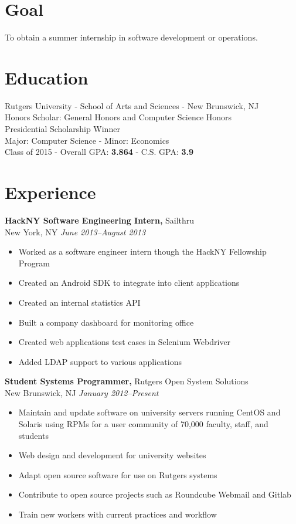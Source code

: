 \documentclass[margin]{res}
\begin{document}
 
\begin{resume} 

\section{Goal}
To obtain a summer internship in software development or operations.
 
\section{Education} 
Rutgers University - School of Arts and Sciences - New Brunswick, NJ\\
Honors Scholar: General Honors and Computer Science Honors\\
Presidential Scholarship Winner\\
Major: Computer Science - Minor: Economics\\
Class of 2015 - Overall GPA: {\bf 3.864} - C.S. GPA: {\bf 3.9}

\section{Experience}

{\bf HackNY Software Engineering Intern,} Sailthru\\
New York, NY \textit{June 2013--August 2013}
\begin{itemize} \itemsep -2pt
    \item Worked as a software engineer intern though the HackNY Fellowship
    Program
    \item Created an Android SDK to integrate into client applications
    \item Created an internal statistics API
    \item Built a company dashboard for monitoring office
    \item Created web applications test cases in Selenium Webdriver
    \item Added LDAP support to various applications
\end{itemize}


{\bf Student Systems Programmer,} Rutgers Open System Solutions\\
New Brunswick, NJ \textit{January 2012--Present}
\begin{itemize} \itemsep -2pt %
	\item Maintain and update software on university servers running CentOS and Solaris using RPMs for a user community of 70,000 faculty, staff, and students
	\item Web design and development for university websites
	\item Adapt open source software for use on Rutgers systems
	\item Contribute to open source projects such as Roundcube Webmail and
    Gitlab
	\item Train new workers with current practices and workflow
\end{itemize}


\end{resume}
\end{document}
